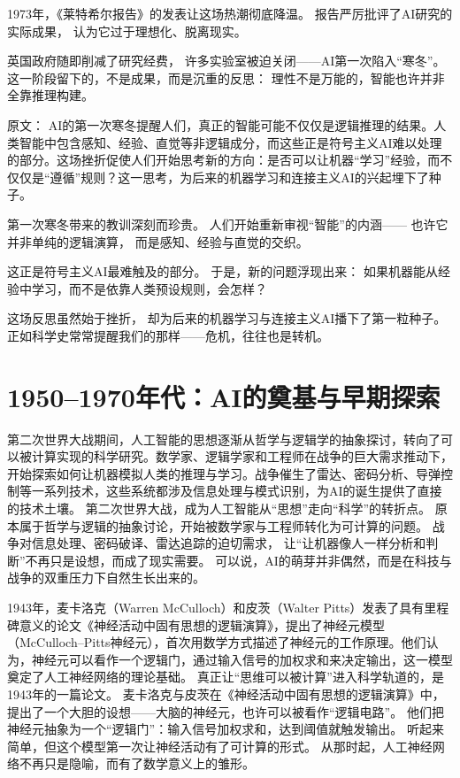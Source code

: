 1973年，《莱特希尔报告》的发表让这场热潮彻底降温。
报告严厉批评了AI研究的实际成果，
认为它过于理想化、脱离现实。

英国政府随即削减了研究经费，
许多实验室被迫关闭——AI第一次陷入“寒冬”。
这一阶段留下的，不是成果，而是沉重的反思：
理性不是万能的，智能也许并非全靠推理构建。

原文：
AI的第一次寒冬提醒人们，真正的智能可能不仅仅是逻辑推理的结果。人类智能中包含感知、经验、直觉等非逻辑成分，而这些正是符号主义AI难以处理的部分。这场挫折促使人们开始思考新的方向：是否可以让机器“学习”经验，而不仅仅是“遵循”规则？这一思考，为后来的机器学习和连接主义AI的兴起埋下了种子。


第一次寒冬带来的教训深刻而珍贵。
人们开始重新审视“智能”的内涵——
也许它并非单纯的逻辑演算，
而是感知、经验与直觉的交织。

这正是符号主义AI最难触及的部分。
于是，新的问题浮现出来：
如果机器能从经验中学习，而不是依靠人类预设规则，会怎样？

这场反思虽然始于挫折，
却为后来的机器学习与连接主义AI播下了第一粒种子。
正如科学史常常提醒我们的那样——危机，往往也是转机。

\section{1950–1970年代：AI的奠基与早期探索}

第二次世界大战期间，人工智能的思想逐渐从哲学与逻辑学的抽象探讨，转向了可以被计算实现的科学研究。数学家、逻辑学家和工程师在战争的巨大需求推动下，开始探索如何让机器模拟人类的推理与学习。战争催生了雷达、密码分析、导弹控制等一系列技术，这些系统都涉及信息处理与模式识别，为AI的诞生提供了直接的技术土壤。
第二次世界大战，成为人工智能从“思想”走向“科学”的转折点。  
原本属于哲学与逻辑的抽象讨论，开始被数学家与工程师转化为可计算的问题。  
战争对信息处理、密码破译、雷达追踪的迫切需求，  
让“让机器像人一样分析和判断”不再只是设想，而成了现实需要。  
可以说，AI的萌芽并非偶然，而是在科技与战争的双重压力下自然生长出来的。  

1943年，麦卡洛克（Warren McCulloch）和皮茨（Walter Pitts）发表了具有里程碑意义的论文《神经活动中固有思想的逻辑演算》，提出了神经元模型（McCulloch–Pitts神经元），首次用数学方式描述了神经元的工作原理。他们认为，神经元可以看作一个逻辑门，通过输入信号的加权求和来决定输出，这一模型奠定了人工神经网络的理论基础。
真正让“思维可以被计算”进入科学轨道的，是1943年的一篇论文。  
麦卡洛克与皮茨在《神经活动中固有思想的逻辑演算》中，  
提出了一个大胆的设想——大脑的神经元，也许可以被看作“逻辑电路”。  
他们把神经元抽象为一个“逻辑门”：输入信号加权求和，达到阈值就触发输出。  
听起来简单，但这个模型第一次让神经活动有了可计算的形式。  
从那时起，人工神经网络不再只是隐喻，而有了数学意义上的雏形。  

